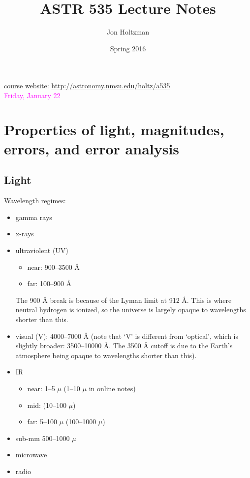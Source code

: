 \documentclass[12pt]{article}
\title{ASTR 535 Lecture Notes}
\author{Jon Holtzman}
\date{Spring 2016}
\begin{document}
\maketitle

\noindent course website: \textcolor{blue}
{\url{http://astronomy.nmsu.edu/holtz/a535}}\\

\noindent \textcolor{magenta}{Friday, January 22}
\section*{Properties of light, magnitudes, errors, and error analysis}

\subsection*{Light}
Wavelength regimes:
\begin{itemize}
    \item gamma rays
    \item x-rays
    \item ultraviolent (UV)
        \begin{itemize}
            \item near: 900--3500 \AA{}
            \item far: 100--900 \AA{}
        \end{itemize}
        The 900 \AA{} break is because of the Lyman limit at 912 \AA{}.
        This is where neutral hydrogen is ionized, so the universe is largely
        opaque to wavelengths shorter than this.
    \item visual (V): 4000--7000 \AA{} (note that `V' is different from `optical',
        which is slightly broader: 3500--10000 \AA{}. The 3500 \AA{} cutoff
        is due to the Earth's atmosphere being opaque to wavelengths shorter
        than this).
    \item IR
        \begin{itemize}
            \item near: 1--5 $\mu$ (1--10 $\mu$ in online notes)
            \item mid: (10--100 $\mu$)
            \item far: 5--100 $\mu$ (100--1000 $\mu$)
        \end{itemize}
    \item sub-mm 500--1000 $\mu$
    \item microwave
    \item radio
\end{itemize}
\end{document}
